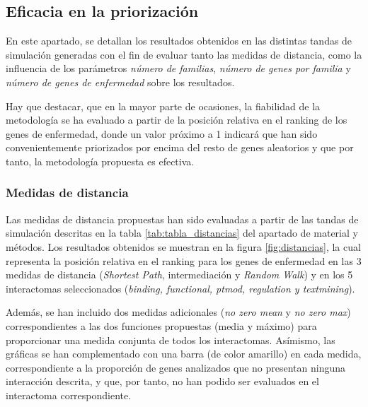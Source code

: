 \medskip
\medskip
 
\subsection{Eficacia en la priorización}

En este apartado, se detallan los resultados obtenidos en las distintas tandas de simulación generadas con el fin de evaluar tanto las medidas de distancia, como la influencia de los parámetros \emph{número de familias}, \emph{número de genes por familia} y \emph{número de genes de enfermedad} sobre los resultados. 

\medskip
Hay que destacar, que en la mayor parte de ocasiones, la fiabilidad de la metodología se ha evaluado a partir de la posición relativa en el ranking de los genes de enfermedad, donde un valor próximo a 1 indicará que han sido convenientemente priorizados por encima del resto de genes aleatorios y que por tanto, la metodología propuesta es efectiva.

\subsubsection{Medidas de distancia}

Las medidas de distancia propuestas han sido evaluadas a partir de las tandas de simulación descritas en la tabla \ref{tab:tabla_distancias} del apartado de material y métodos. Los resultados obtenidos se muestran en la figura \ref{fig:distancias}, la cual representa la posición relativa en el ranking para los genes de enfermedad en las 3 medidas de distancia (\emph{Shortest Path}, intermediación y \emph{Random Walk}) y en los 5 interactomas seleccionados (\emph{binding, functional, ptmod, regulation y textmining}). 

\medskip
Además, se han incluido dos medidas adicionales (\emph{no zero mean} y \emph{no zero max}) correspondientes a las dos funciones propuestas (media y máximo) para proporcionar una medida conjunta de todos los interactomas. Asímismo, las gráficas se han complementado con una barra (de color amarillo) en cada medida, correspondiente a la proporción de genes analizados que no presentan ninguna interacción descrita, y que, por tanto, no han podido ser evaluados en el interactoma correspondiente. 

